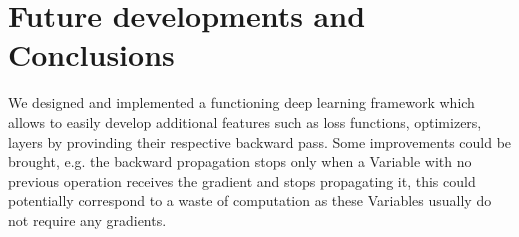 \documentclass[10pt,conference,compsocconf]{IEEEtran}
\begin{document}
\section{Future developments and Conclusions}
We designed and implemented a functioning deep learning framework which allows to easily develop additional features such as loss functions, optimizers, layers by provinding their respective backward pass. Some improvements could be brought, e.g. the backward propagation stops only when a Variable with no previous operation receives the gradient and stops propagating it, this could potentially correspond to a waste of computation as these Variables usually do not require any gradients.
\end{document}
